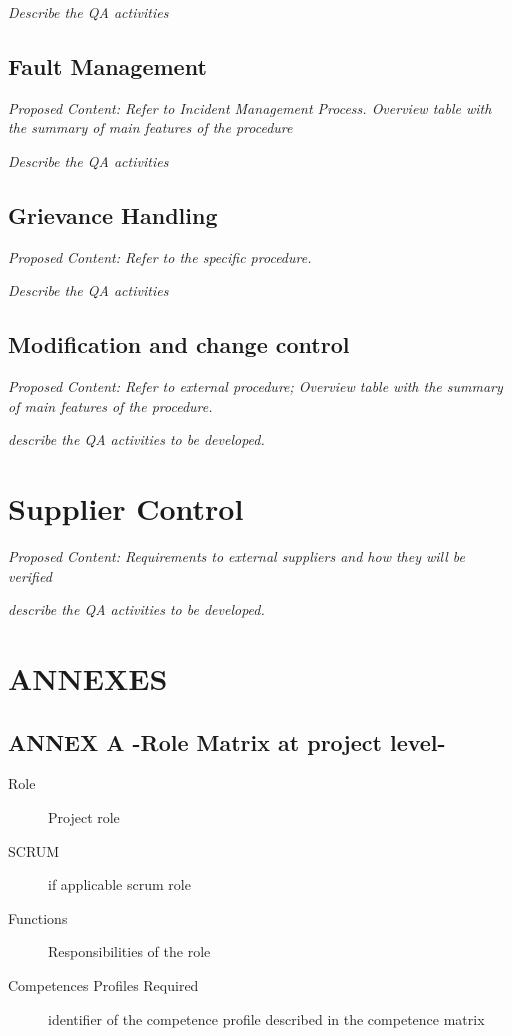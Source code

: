 \documentclass{template/openetcs_article}
\begin{document}
\textit{Describe the QA activities}

\subsection{Fault Management}
\textit{Proposed Content: Refer to Incident Management Process. Overview table with the summary of main features of the procedure}

\textit{Describe the QA activities}

\subsection{Grievance Handling}
\textit{Proposed Content: Refer to the specific procedure. }

\textit{Describe the QA activities}

\subsection{Modification and change control }
\textit{Proposed Content: Refer to external procedure; Overview table with the summary of main features of the procedure.}

\textit{describe the QA activities to be developed.}

\section{Supplier Control}
\textit{Proposed Content: Requirements to external suppliers and how they will be verified}

\textit{describe the QA activities to be developed.}

\section{ANNEXES}

\subsection{ANNEX A -Role Matrix at project level-}

\begin{description}
\item[Role] Project role
\item[SCRUM] if applicable scrum role
\item[Functions] Responsibilities of the role
\item[Competences Profiles Required] identifier of the competence profile described in the competence matrix
\end{description}
\end{document}
